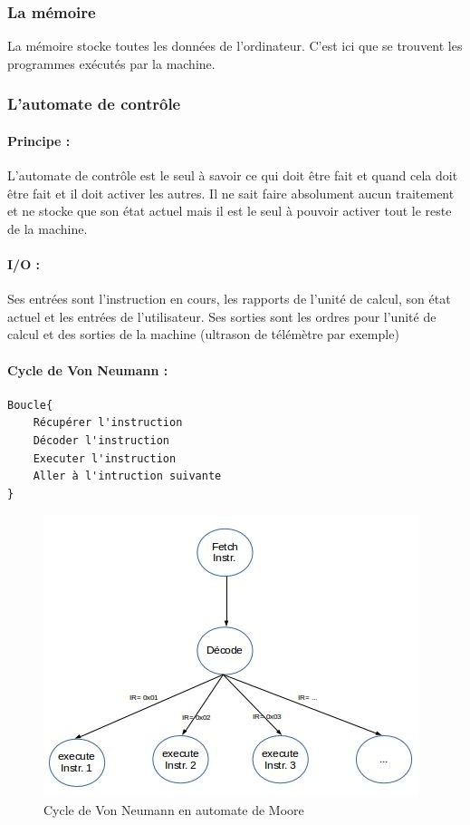 \documentclass[10pt,a4paper,twoside]{article}
\begin{document}
\subsubsection{La mémoire}
La mémoire stocke toutes les données de l'ordinateur. C'est ici que se trouvent les programmes exécutés par la machine.

\subsubsection{L'automate de contrôle}
\paragraph{Principe :} L'automate de contrôle est le seul à savoir ce qui doit être fait et quand cela doit être fait et il doit activer les autres. Il ne sait faire absolument aucun traitement et ne stocke que son état actuel mais il est le seul à pouvoir activer tout le reste de la machine.
\paragraph{I/O :}Ses entrées sont l'instruction en cours, les rapports de l'unité de calcul, son état actuel et les entrées de l'utilisateur. Ses sorties sont les ordres pour l'unité de calcul et des sorties de la machine (ultrason de télémètre par exemple)

\paragraph{Cycle de Von Neumann :}
\begin{verbatim}
Boucle{
    Récupérer l'instruction
    Décoder l'instruction
    Executer l'instruction
    Aller à l'intruction suivante
}
\end{verbatim}

\begin{figure}[hbtp]
\caption{Cycle de Von Neumann en automate de Moore}
\centering
\includegraphics[scale=1]{cycle_automate_VN.jpg} 
\end{figure}
\FloatBarrier
\end{document}
